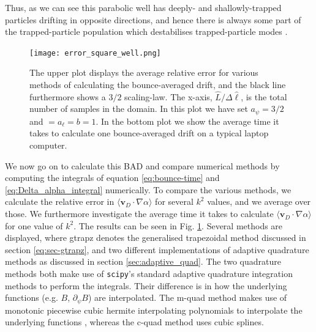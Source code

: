 Thus, as we can see this parabolic well has deeply- and shallowly-trapped particles drifting in opposite directions, and hence there is always some part of the trapped-particle population which destabilises trapped-particle modes \cite{rosenbluth1968,proll2012resilience}.
\par 
\begin{figure}
\vspace{5pt}%
\texttt{[image: error\_square\_well.png]}
\caption{\label{fig:err-analysis} The upper plot displays the average relative error for various methods of calculating the bounce-averaged drift, and the black line furthermore shows a $3/2$ scaling-law. The x-axis, $\hat{L}/\Delta \hat{\ell}$, is the total number of samples in the domain. In this plot we have set $a_\psi = 3/2$ and $ = a_\ell = b = 1$. In the bottom plot we show the average time it takes to calculate one bounce-averaged drift on a typical laptop computer.} 
\end{figure}
We now go on to calculate this BAD and compare numerical methods by computing the integrals of equation \eqref{eq:bounce-time} and \eqref{eq:Delta_alpha_integral} numerically. To compare the various methods, we calculate the relative error in $\langle \mathbf{v}_D \cdot \nabla \alpha \rangle$ for several $k^2$ values, and we average over those. We furthermore investigate the average time it takes to calculate $\langle \mathbf{v}_D \cdot \nabla \alpha \rangle$ for one value of $k^2$. The results can be seen in Fig. \ref{fig:err-analysis}. Several methods are displayed, where gtrapz denotes the generalised trapezoidal method discussed in section \ref{eq:sec-gtrapz}, and two different implementations of adaptive quadrature methods as discussed in section \ref{sec:adaptive_quad}. The two quadrature methods both make use of \texttt{scipy}'s standard adaptive quadrature integration methods to perform the integrals. Their difference is in how the underlying functions (e.g. $B$, $\partial_\psi B$) are interpolated. The m-quad method makes use of monotonic piecewise cubic hermite interpolating polynomials to interpolate the underlying functions \cite{fritsch1984method}, whereas the c-quad method uses cubic splines. \par
